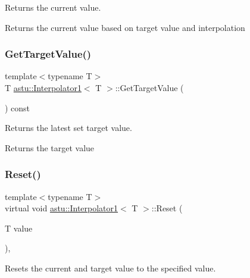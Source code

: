 Returns the current value.

\begin{DoxyReturn}{Returns}
the current value based on target value and interpolation 
\end{DoxyReturn}
\mbox{\label{classastu_1_1Interpolator1_ad5d42155623ede0a32350444f401903a}} 
\subsubsection{\texorpdfstring{Get\+Target\+Value()}{GetTargetValue()}}
{\footnotesize\ttfamily template$<$typename T$>$ \\
T \hyperlink{classastu_1_1Interpolator1}{astu\+::\+Interpolator1}$<$ T $>$\+::Get\+Target\+Value (\begin{DoxyParamCaption}{ }\end{DoxyParamCaption}) const\hspace{0.3cm}{\ttfamily [inline]}}

Returns the latest set target value.

\begin{DoxyReturn}{Returns}
the target value 
\end{DoxyReturn}
\mbox{\label{classastu_1_1Interpolator1_ae74b46754efa0cb8a2c768b1b3a66881}} 
\subsubsection{\texorpdfstring{Reset()}{Reset()}}
{\footnotesize\ttfamily template$<$typename T$>$ \\
virtual void \hyperlink{classastu_1_1Interpolator1}{astu\+::\+Interpolator1}$<$ T $>$\+::Reset (\begin{DoxyParamCaption}\item[{T}]{value }\end{DoxyParamCaption})\hspace{0.3cm}{\ttfamily [inline]}, {\ttfamily [virtual]}}

Resets the current and target value to the specified value.


